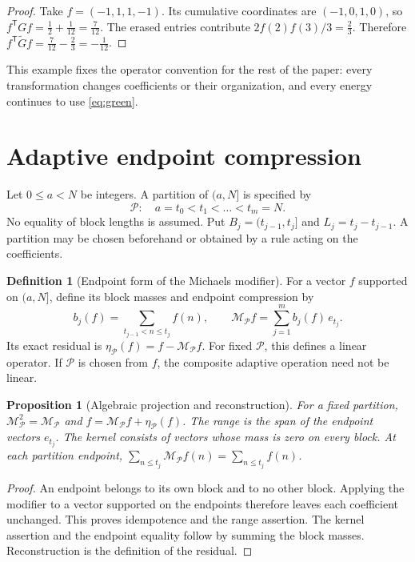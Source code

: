 \documentclass[11pt]{article}
\newtheorem{proposition}[theorem]{Proposition}
\theoremstyle{definition}
\newtheorem{definition}[theorem]{Definition}
\theoremstyle{remark}
\begin{document}
\begin{proof}
Take $f=(-1,1,1,-1)$. Its cumulative coordinates are $(-1,0,1,0)$, so $f^{\mathsf T}Gf=\frac12+\frac1{12}=\frac7{12}$. The erased entries contribute $2f(2)f(3)/3=\frac23$. Therefore $f^{\mathsf T}\widetilde Gf=\frac7{12}-\frac23=-\frac1{12}$.
\end{proof}

This example fixes the operator convention for the rest of the paper: every transformation changes coefficients or their organization, and every energy continues to use \eqref{eq:green}.

\section{Adaptive endpoint compression}\label{sec:compression}

Let $0\le a<N$ be integers. A partition of $(a,N]$ is specified by
\begin{equation}
\mathcal P:\quad a=t_0<t_1<\dots<t_m=N.
\end{equation}
No equality of block lengths is assumed. Put $B_j=(t_{j-1},t_j]$ and $L_j=t_j-t_{j-1}$. A partition may be chosen beforehand or obtained by a rule acting on the coefficients.

\begin{definition}[Endpoint form of the Michaels modifier]
For a vector $f$ supported on $(a,N]$, define its block masses and endpoint compression by
\begin{equation}
b_j(f)=\sum_{t_{j-1}<n\le t_j}f(n),\qquad \mathcal M_{\mathcal P}f=\sum_{j=1}^m b_j(f)\,e_{t_j}.
\end{equation}
Its exact residual is $\eta_{\mathcal P}(f)=f-\mathcal M_{\mathcal P}f$. For fixed $\mathcal P$, this defines a linear operator. If $\mathcal P$ is chosen from $f$, the composite adaptive operation need not be linear.
\end{definition}

\begin{proposition}[Algebraic projection and reconstruction]
For a fixed partition, $\mathcal M_{\mathcal P}^2=\mathcal M_{\mathcal P}$ and $f=\mathcal M_{\mathcal P}f+\eta_{\mathcal P}(f)$. The range is the span of the endpoint vectors $e_{t_j}$. The kernel consists of vectors whose mass is zero on every block. At each partition endpoint, $\sum_{n\le t_j}\mathcal M_{\mathcal P}f(n)=\sum_{n\le t_j}f(n)$.
\end{proposition}

\begin{proof}
An endpoint belongs to its own block and to no other block. Applying the modifier to a vector supported on the endpoints therefore leaves each coefficient unchanged. This proves idempotence and the range assertion. The kernel assertion and the endpoint equality follow by summing the block masses. Reconstruction is the definition of the residual.
\end{proof}
\end{document}
